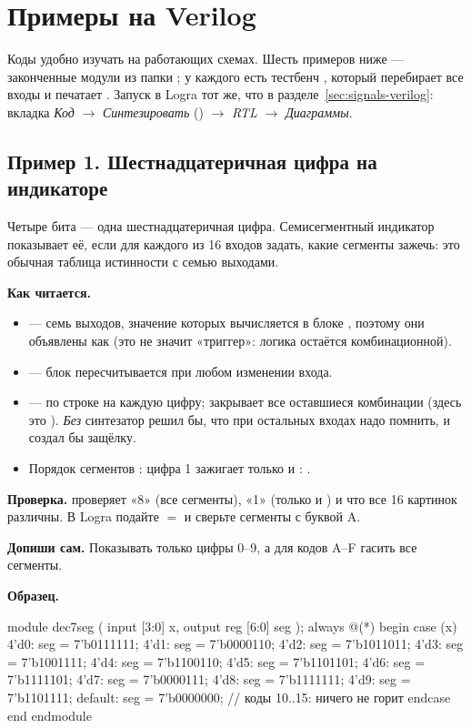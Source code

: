 \section{Примеры на Verilog}
\label{sec:codes-verilog}

Коды удобно изучать на работающих схемах. Шесть примеров ниже --- законченные
модули из папки ; у каждого есть тестбенч
, который перебирает все входы и печатает . Запуск
в Logra тот же, что в разделе~\ref{sec:signals-verilog}: вкладка \emph{Код}
$\to$ \emph{Синтезировать} () $\to$ \emph{RTL} $\to$
\emph{Диаграммы}.

\subsection{Пример 1. Шестнадцатеричная цифра на индикаторе}

Четыре бита --- одна шестнадцатеричная цифра. Семисегментный индикатор
показывает её, если для каждого из 16 входов задать, какие сегменты зажечь:
это обычная таблица истинности с семью выходами.


\textbf{Как читается.}
\begin{itemize}
  \item {} --- семь выходов, значение которых вычисляется в блоке , поэтому они объявлены как  (это не значит «триггер»: логика остаётся комбинационной).
  \item {} --- блок пересчитывается при любом изменении входа.
  \item {} --- по строке на каждую цифру;  закрывает все оставшиеся комбинации (здесь это ). \emph{Без}  синтезатор решил бы, что при остальных входах  надо помнить, и создал бы защёлку.
  \item Порядок сегментов : цифра 1 зажигает только  и : .
\end{itemize}
\textbf{Проверка.}  проверяет «8» (все сегменты), «1» (только
 и ) и что все 16 картинок различны. В Logra подайте
 $=$  и сверьте сегменты с буквой A.

\textbf{Допиши сам.} Показывать только цифры 0--9, а для кодов A--F гасить все сегменты.

\textbf{Образец.}\par\nopagebreak
\begin{vcode}
module dec7seg (
    input      [3:0] x,
    output reg [6:0] seg
);
    always @(*) begin
        case (x)
            4'd0: seg = 7'b0111111;
            4'd1: seg = 7'b0000110;
            4'd2: seg = 7'b1011011;
            4'd3: seg = 7'b1001111;
            4'd4: seg = 7'b1100110;
            4'd5: seg = 7'b1101101;
            4'd6: seg = 7'b1111101;
            4'd7: seg = 7'b0000111;
            4'd8: seg = 7'b1111111;
            4'd9: seg = 7'b1101111;
            default: seg = 7'b0000000;   // коды 10..15: ничего не горит
        endcase
    end
endmodule
\end{vcode}

